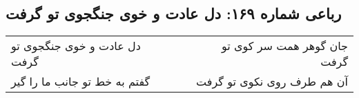 \begin{center}
\section*{رباعی شماره ۱۶۹: دل عادت و خوی جنگجوی تو گرفت}
\label{sec:sh169}
\begin{longtable}{l p{0.5cm} r}
دل عادت و خوی جنگجوی تو گرفت
&&
جان گوهر همت سر کوی تو گرفت
\\
گفتم به خط تو جانب ما را گیر
&&
آن هم طرف روی نکوی تو گرفت
\\
\end{longtable}
\end{center}
